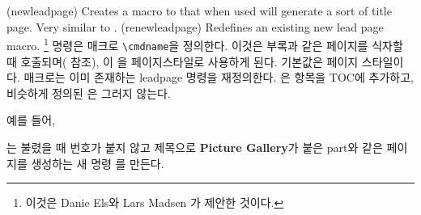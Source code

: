 \begin{syntax}
\cmd{\newleadpage} \\
\cmd{\renewleadpage} \\
\end{syntax}
\glossary(newleadpage)%
{}%
{Creates a macro to that when used will generate a sort of title
page. Very similar to .}
\glossary(renewleadpage)%
{}%
{Redefines an existing new lead page macro.}
\cmd{\newleadpage}\footnote{이것은 Danie Els와 Lars Madsen
가 제안한 것이다.} 명령은 매크로 \verb?\cmdname?을 정의한다.
이것은 부록과 같은 페이지를 식자할 때 호출되며( 참조),
이 을 페이지스타일로 사용하게 된다. 기본값은
 페이지 스타일이다.
\cmd{\renewleadpage} 매크로는 이미 존재하는 leadpage 명령을 재정의한다.
\cmd{\cmdname}은 항목을 TOC에 추가하고, 비슷하게 정의된 \cmd{\cmdname*}은 그러지
않는다.

예를 들어,
\begin{lcode}
\end{lcode}
는 불렸을 때 번호가 붙지 않고 제목으로 \textbf{Picture Gallery}가 붙은 part와
같은 페이지를 생성하는 새 명령 를 만든다.

